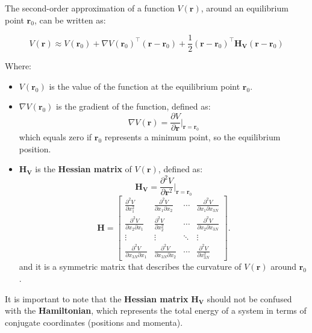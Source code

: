 \documentclass[English, Lau, oneside]{sapthesis}
\begin{document}
The second-order approximation of a function \( V(\mathbf{r}) \), around an equilibrium point \( \mathbf{r}_0 \), can be written as:

\begin{equation}
V(\mathbf{r}) \approx V(\mathbf{r}_0) + \nabla V(\mathbf{r}_0)^\top (\mathbf{r} - \mathbf{r}_0) + \frac{1}{2} (\mathbf{r} - \mathbf{r}_0)^\top \mathbf{H_V} (\mathbf{r} - \mathbf{r}_0)
\end{equation}

Where:
\begin{itemize}
    \item \( V(\mathbf{r}_0) \) is the value of the function at the equilibrium point \( \mathbf{r}_0 \).
    \item \( \nabla V(\mathbf{r}_0) \) is the gradient of the function, defined as:
    \begin{equation}
    \nabla V(\mathbf{r}) = \frac{\partial V}{\partial \mathbf{r}} \bigg|_{\mathbf{r} = \mathbf{r}_0}
    \end{equation}
    which equals zero if \( \mathbf{r}_0 \) represents a minimum point, so the equilibrium position.
    \item \( \mathbf{H_V} \) is the \textbf{Hessian matrix} of \( V(\mathbf{r}) \), defined as:
    \begin{equation}
		\mathbf{H_V} = \frac{\partial^2 V}{\partial \mathbf{r}^2} \bigg|_{\mathbf{r} = \mathbf{r}_0}
    \end{equation}
    \[
    \mathbf{H} = \begin{bmatrix}
    \frac{\partial^2 V}{\partial x_1^2} & \frac{\partial^2 V}{\partial x_1 \partial x_2} & \cdots & \frac{\partial^2 V}{\partial x_1 \partial x_{3N}} \\
    \frac{\partial^2 V}{\partial x_2 \partial x_1} & \frac{\partial^2 V}{\partial x_2^2} & \cdots & \frac{\partial^2 V}{\partial x_2 \partial x_{3N}} \\
    \vdots & \vdots & \ddots & \vdots \\
    \frac{\partial^2 V}{\partial x_{3N} \partial x_1} & \frac{\partial^2 V}{\partial x_{3N} \partial x_2} & \cdots & \frac{\partial^2 V}{\partial x_{3N}^2}
    \end{bmatrix}.
    \]
    and it is a symmetric matrix that describes the curvature of \( V(\mathbf{r}) \) around \( \mathbf{r}_0 \).
\end{itemize}

It is important to note that the \textbf{Hessian matrix} \( \mathbf{H_V} \) should not be confused with the \textbf{Hamiltonian}, which represents the total energy of a system in terms of conjugate coordinates (positions and momenta).
\end{document}
